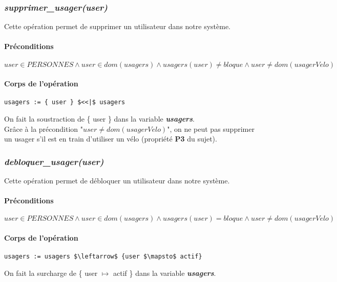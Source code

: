 \documentclass[12pt]{article}
\begin{document}
\subsubsection{\textit{supprimer\_usager(user)}}
Cette opération permet de supprimer un utilisateur dans notre système.
\paragraph{Préconditions}
\[user \in PERSONNES \land user \in dom(usagers) \land usagers(user) \neq bloque \land user \neq dom(usagerVelo) \]

\paragraph{Corps de l'opération}
\textbf{}
\begin{lstlisting}[mathescape]
  usagers := { user } $<<|$ usagers
\end{lstlisting}

On fait la soustraction de \{ user \} dans la variable \textit{\textbf{usagers}}. \\

Grâce à la précondition "$user \neq dom(usagerVelo)$", on ne peut pas supprimer un usager s'il est en train d'utiliser un vélo (propriété \textbf{P3} du sujet).

\subsubsection{\textit{debloquer\_usager(user)}}
Cette opération permet de débloquer un utilisateur dans notre système.
\paragraph{Préconditions}
\[ user \in PERSONNES \land user \in dom(usagers) \land usagers(user) = bloque \land user \neq dom(usagerVelo) \]

\paragraph{Corps de l'opération}
\textbf{}
\begin{lstlisting}[mathescape]
  usagers := usagers $\leftarrow$ {user $\mapsto$ actif}
\end{lstlisting}

On fait la surcharge de \{ user $\mapsto$ actif \} dans la variable \textit{\textbf{usagers}}.\\
\end{document}
